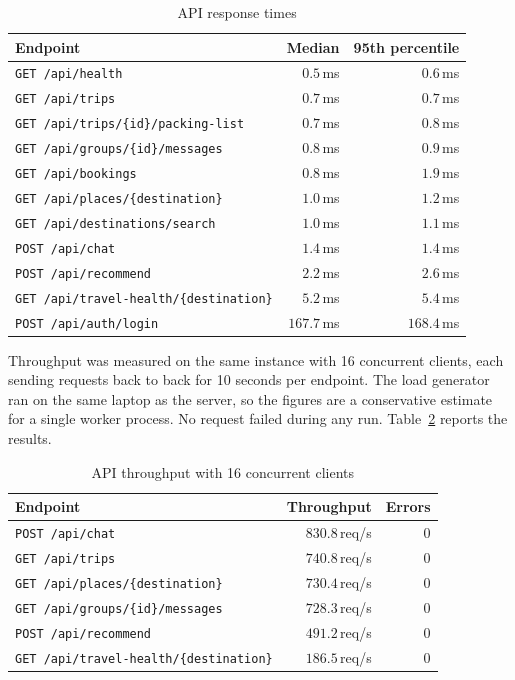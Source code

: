 \begin{table}[htbp]
\centering
\begin{tabular}{|l|r|r|}
  \hline
  \textbf{Endpoint} & \textbf{Median} & \textbf{95th percentile} \\
  \hline
  \texttt{GET /api/health} & $0.5$\,ms & $0.6$\,ms \\
  \hline
  \texttt{GET /api/trips} & $0.7$\,ms & $0.7$\,ms \\
  \hline
  \texttt{GET /api/trips/\{id\}/packing-list} & $0.7$\,ms & $0.8$\,ms \\
  \hline
  \texttt{GET /api/groups/\{id\}/messages} & $0.8$\,ms & $0.9$\,ms \\
  \hline
  \texttt{GET /api/bookings} & $0.8$\,ms & $1.9$\,ms \\
  \hline
  \texttt{GET /api/places/\{destination\}} & $1.0$\,ms & $1.2$\,ms \\
  \hline
  \texttt{GET /api/destinations/search} & $1.0$\,ms & $1.1$\,ms \\
  \hline
  \texttt{POST /api/chat} & $1.4$\,ms & $1.4$\,ms \\
  \hline
  \texttt{POST /api/recommend} & $2.2$\,ms & $2.6$\,ms \\
  \hline
  \texttt{GET /api/travel-health/\{destination\}} & $5.2$\,ms & $5.4$\,ms \\
  \hline
  \texttt{POST /api/auth/login} & $167.7$\,ms & $168.4$\,ms \\
  \hline
\end{tabular}
\caption{API response times}
\label{tab:performance}
\end{table}

Throughput was measured on the same instance with 16 concurrent clients,
each sending requests back to back for 10 seconds per endpoint. The load
generator ran on the same laptop as the server, so the figures are a
conservative estimate for a single worker process. No request failed during
any run. Table~\ref{tab:throughput} reports the results.

\begin{table}[htbp]
\centering
\begin{tabular}{|l|r|r|}
  \hline
  \textbf{Endpoint} & \textbf{Throughput} & \textbf{Errors} \\
  \hline
  \texttt{POST /api/chat} & $830.8$\,req/s & $0$ \\
  \hline
  \texttt{GET /api/trips} & $740.8$\,req/s & $0$ \\
  \hline
  \texttt{GET /api/places/\{destination\}} & $730.4$\,req/s & $0$ \\
  \hline
  \texttt{GET /api/groups/\{id\}/messages} & $728.3$\,req/s & $0$ \\
  \hline
  \texttt{POST /api/recommend} & $491.2$\,req/s & $0$ \\
  \hline
  \texttt{GET /api/travel-health/\{destination\}} & $186.5$\,req/s & $0$ \\
  \hline
\end{tabular}
\caption{API throughput with 16 concurrent clients}
\label{tab:throughput}
\end{table}

